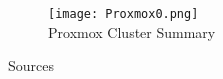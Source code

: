 \begin{frame}
    \begin{figure}
        \centering
        \texttt{[image: Proxmox0.png]}\\
        Proxmox Cluster Summary~\cite{proxmox_overview}
    \end{figure}
\end{frame}

\begin{frame}{Sources}
    \printbibliography[title = {Sources}, heading = none]
\end{frame}
